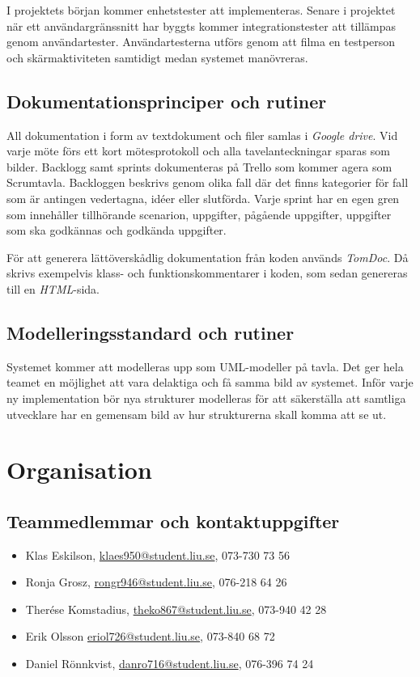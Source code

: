 \documentclass[a4paper,12pt,oneside,final]{extbook}
\begin{document}
I projektets början kommer enhetstester att implementeras. Senare
i projektet när ett användargränssnitt har byggts kommer
integrationstester att tillämpas genom användartester. Användartesterna
utförs genom att filma en testperson och skärmaktiviteten samtidigt
medan systemet manövreras.

\section{Dokumentationsprinciper och rutiner}
All dokumentation i form av textdokument och filer samlas i \emph{Google
drive}. Vid varje möte förs ett kort mötesprotokoll och alla
tavelanteckningar sparas som bilder. Backlogg samt sprints dokumenteras
på Trello som kommer agera som Scrumtavla. Backloggen beskrivs genom
olika fall där det finns kategorier för fall som är antingen vedertagna,
idéer eller slutförda. Varje sprint har en egen gren som innehåller
tillhörande scenarion, uppgifter, pågående uppgifter, uppgifter
som ska godkännas och godkända uppgifter.

För att generera lättöverskådlig dokumentation från koden används
\emph{TomDoc}. Då skrivs exempelvis klass- och funktionskommentarer i koden,
som sedan genereras till en \emph{HTML}-sida.

\section{Modelleringsstandard och rutiner}
Systemet kommer att modelleras upp som UML-modeller på tavla.
Det ger hela teamet en möjlighet att vara delaktiga och få samma bild
av systemet. Inför varje ny implementation bör nya strukturer modelleras
för att säkerställa att samtliga utvecklare har en gemensam bild av hur
strukturerna skall komma att se ut.

\chapter{Organisation}

\section{Teammedlemmar och kontaktuppgifter}
\begin{itemize}
  \item Klas Eskilson, \href{mailto:klaes950@student.liu.se}{klaes950@student.liu.se}, 073-730 73 56
  \item Ronja Grosz, \href{rongr946@student.liu.se}{rongr946@student.liu.se}, 076-218 64 26
  \item Therése Komstadius, \href{theko867@student.liu.se}{theko867@student.liu.se}, 073-940 42 28
  \item Erik Olsson \href{eriol726@student.liu.se}{eriol726@student.liu.se}, 073-840 68 72
  \item Daniel Rönnkvist, \href{danro716@student.liu.se}{danro716@student.liu.se}, 076-396 74 24
\end{itemize}
\end{document}
